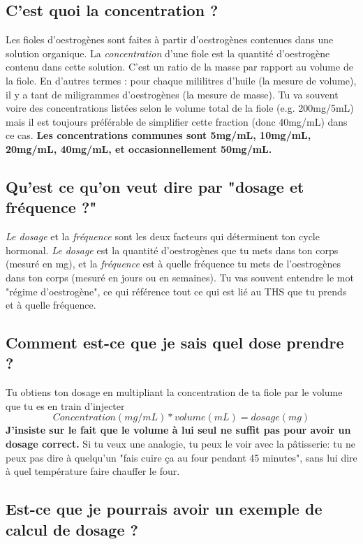\documentclass{article}
\begin{document}
\subsection{C'est quoi la concentration ?}

Les fioles d'oestrogènes sont faites à partir d'oestrogènes contenues dans une solution organique. La \textit{concentration} d'une fiole est la quantité d'oestrogène contenu dans cette solution. C'est un ratio de la masse par rapport au volume de la fiole. En d'autres termes : pour chaque mililitres d'huile (la mesure de volume), il y a tant de miligrammes d'oestrogènes (la mesure de masse). Tu va souvent voire des concentrations listées selon le volume total de la fiole (e.g. 200mg/5mL) mais il est toujours préférable de simplifier cette fraction (donc 40mg/mL) dans ce cas. \textbf{Les concentrations communes sont 5mg/mL, 10mg/mL, 20mg/mL, 40mg/mL, et occasionnellement 50mg/mL.}

\subsection{Qu'est ce qu'on veut dire par "dosage et fréquence ?"}

\textit{Le dosage} et la \textit{fréquence} sont les deux facteurs qui déterminent ton cycle hormonal. \textit{Le dosage} est la quantité d'oestrogènes que tu mets dans ton corps (mesuré en mg), et la \textit{fréquence} est à quelle fréquence tu mets de l'oestrogènes dans ton corps (mesuré en jours ou en semaines). Tu vas souvent entendre le mot "régime d'oestrogène", ce qui référence tout ce qui est lié au THS que tu prends et à quelle fréquence.

\subsection{Comment est-ce que je sais quel dose prendre ?}

Tu obtiens ton dosage en multipliant la concentration de ta fiole par le volume que tu es en train d'injecter \[Concentration (mg/mL) * volume (mL) = dosage (mg)\] \textbf{J'insiste sur le fait que le volume à lui seul ne suffit pas pour avoir un dosage correct.} Si tu veux une analogie, tu peux le voir avec la pâtisserie: tu ne peux pas dire à quelqu'un "fais cuire ça au four pendant 45 minutes", sans lui dire à quel température faire chauffer le four.

\subsection{Est-ce que je pourrais avoir un exemple de calcul de dosage ?}
\end{document}
